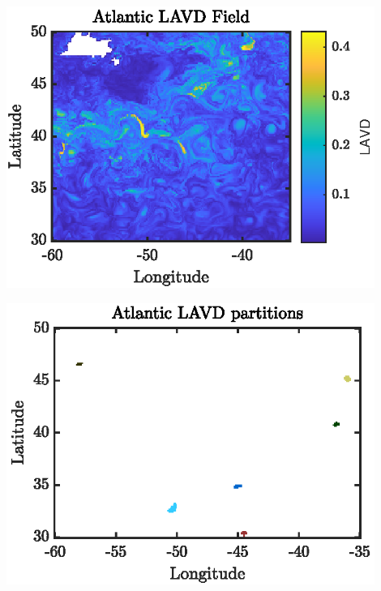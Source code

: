\documentclass[english,svgnames,notes=hide,14pt]{beamer}
\newcommand{\sectslide}[1]{
\section{#1}
\begin{frame}
	\centering\Large
	\thesection.\, #1
\end{frame}
}
\begin{document}
\begin{frame}
\centering
	\includegraphics[width=0.9\textwidth]{../figures/atlantic_lavd}

\end{frame}

\begin{frame}
	\centering
	\includegraphics[width=0.9\textwidth]{../figures/atlantic_member_lavd}
\end{frame}



\end{document}

